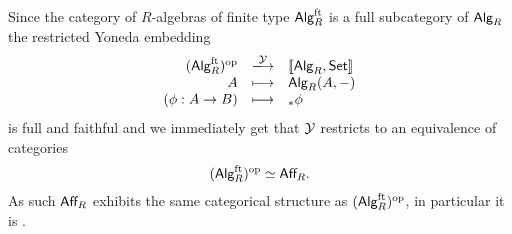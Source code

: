 	Since the category of $R$-algebras of finite type $\textsf{Alg}_R^{\text{ft}}$ is a full subcategory of $\textsf{Alg}_R$ the restricted Yoneda embedding
	\begin{equation*}
		\begin{array}{rcl}
			(\ncat{Alg}_R^\ft)^\op & \xlongrightarrow{\fun{Y}} & [\![\ncat{Alg}_R,\ncat{Set}]\!]\\
			A & \longmapsto & \ncat{Alg}_R(A,-)\\
			(\phi:A\rightarrow B) & \longmapsto & \pre\phi
		\end{array}
	\end{equation*}
	is full and faithful and we immediately get that $\mathcal{Y}$ restricts to an equivalence of categories
	\begin{equation*}
		(\textsf{Alg}_R^{\text{ft}})^{\text{op}} \simeq \textsf{Aff}_R.
	\end{equation*}
	As such $\textsf{Aff}_R$ exhibits the same categorical structure as $(\textsf{Alg}_R^{\text{ft}})^{\text{op}}$, in particular it is .
